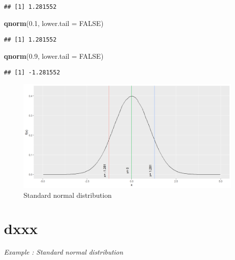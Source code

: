 \documentclass[
]{book}
\newenvironment{Shaded}{\begin{snugshade}}{\end{snugshade}}
\newcommand{\AttributeTok}[1]{\textcolor[rgb]{0.13,0.29,0.53}{#1}}
\newcommand{\ConstantTok}[1]{\textcolor[rgb]{0.56,0.35,0.01}{#1}}
\newcommand{\FloatTok}[1]{\textcolor[rgb]{0.00,0.00,0.81}{#1}}
\newcommand{\FunctionTok}[1]{\textcolor[rgb]{0.13,0.29,0.53}{\textbf{#1}}}
\newcommand{\NormalTok}[1]{#1}
\begin{document}
\begin{verbatim}
## [1] 1.281552
\end{verbatim}

\begin{Shaded}
\begin{Highlighting}[]
\FunctionTok{qnorm}\NormalTok{(}\FloatTok{0.1}\NormalTok{, }\AttributeTok{lower.tail =} \ConstantTok{FALSE}\NormalTok{)}
\end{Highlighting}
\end{Shaded}

\begin{verbatim}
## [1] 1.281552
\end{verbatim}

\begin{Shaded}
\begin{Highlighting}[]
\FunctionTok{qnorm}\NormalTok{(}\FloatTok{0.9}\NormalTok{,  }\AttributeTok{lower.tail =} \ConstantTok{FALSE}\NormalTok{)}
\end{Highlighting}
\end{Shaded}

\begin{verbatim}
## [1] -1.281552
\end{verbatim}

\begin{figure}

{\centering \includegraphics{figure/norm3-1} 

}

\caption{Standard normal distribution}\label{fig:norm3}
\end{figure}

\hypertarget{dxxx}{%
\section{dxxx}\label{dxxx}}

\emph{Example : Standard normal distribution}
\end{document}
